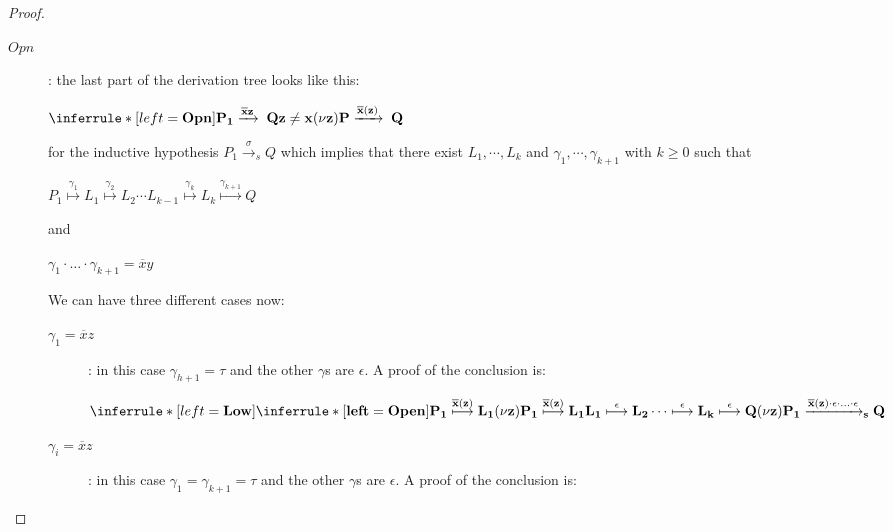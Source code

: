 \begin{proposition}
\begin{proof}
\begin{description}
      \item[$Opn$]: 
	the last part of the derivation tree looks like this:
	\begin{center}
	  $$	 
	\end{center}
	for the inductive hypothesis $P_{1} \xrightarrow{\sigma}_{s} Q$ which implies that there exist $L_{1}, \cdots, L_{k}$ and $\gamma_{1}, \cdots, \gamma_{k+1}$ with $k$ such that 
	\begin{center}
	  $P_{1}  L_{1}   L_{2} \cdots L_{k-1}  L_{k}  Q$ 
	\end{center}
	and 
	\begin{center}
	  $\gamma_{1} \cdot \ldots \cdot \gamma_{k+1} =  y$
	\end{center}
	We can have three different cases now: 
	\begin{description}
	  \item[$\gamma_{1}=z$]:
	    in this case $\gamma_{h+1}=\tau$ and the other $\gamma$s are $\epsilon$. A proof of the conclusion is:
	    \begin{center}
	      $$	  
	    \end{center}
	  \item[$\gamma_{i}=z$]:
	    in this case $\gamma_{1}=\gamma_{k+1}=\tau$ and the other $\gamma$s are $\epsilon$. A proof of the conclusion is:
	    \begin{center}

\end{center}
\end{description}
\end{description}
\end{proof}
\end{proposition}
